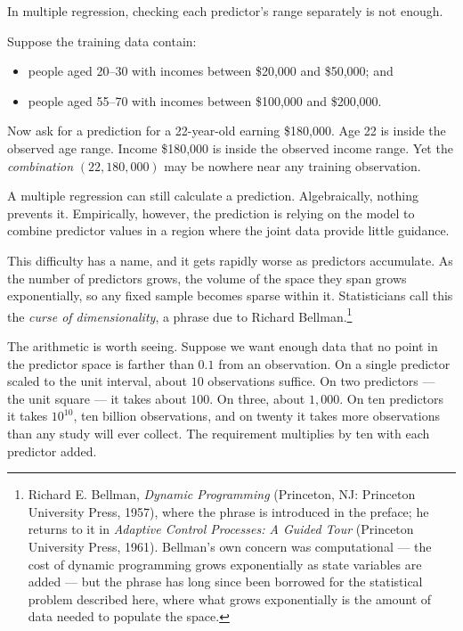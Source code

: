 \documentclass[11pt]{report}
\begin{document}
In multiple regression, checking each predictor's range separately is not enough.

Suppose the training data contain:

\begin{itemize}
    \item people aged 20--30 with incomes between \$20,000 and \$50,000; and
    \item people aged 55--70 with incomes between \$100,000 and \$200,000.
\end{itemize}

Now ask for a prediction for a 22-year-old earning \$180,000. Age 22 is inside the observed age range. Income \$180,000 is inside the observed income range. Yet the \emph{combination} \((22,180{,}000)\) may be nowhere near any training observation.

A multiple regression can still calculate a prediction. Algebraically, nothing prevents it. Empirically, however, the prediction is relying on the model to combine predictor values in a region where the joint data provide little guidance.

This difficulty has a name, and it gets rapidly worse as predictors accumulate. As the number of predictors grows, the volume of the space they span grows exponentially, so any fixed sample becomes sparse within it. Statisticians call this the \emph{curse of dimensionality}, a phrase due to Richard Bellman.\footnote{Richard E. Bellman, \emph{Dynamic Programming} (Princeton, NJ: Princeton University Press, 1957), where the phrase is introduced in the preface; he returns to it in \emph{Adaptive Control Processes: A Guided Tour} (Princeton University Press, 1961). Bellman's own concern was computational --- the cost of dynamic programming grows exponentially as state variables are added --- but the phrase has long since been borrowed for the statistical problem described here, where what grows exponentially is the amount of data needed to populate the space.}

The arithmetic is worth seeing. Suppose we want enough data that no point in the predictor space is farther than \(0.1\) from an observation. On a single predictor scaled to the unit interval, about \(10\) observations suffice. On two predictors --- the unit square --- it takes about \(100\). On three, about \(1{,}000\). On ten predictors it takes \(10^{10}\), ten billion observations, and on twenty it takes more observations than any study will ever collect. The requirement multiplies by ten with each predictor added.
\end{document}
